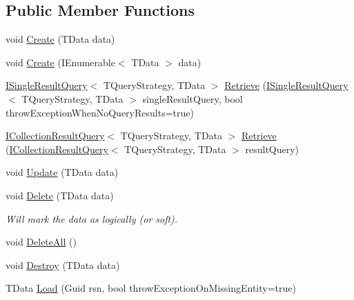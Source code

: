 \subsection*{Public Member Functions}
\begin{DoxyCompactItemize}
\item 
void \hyperlink{interfaceCqrs_1_1Repositories_1_1IRepository_a240c8d094207a22b0c805a5c830d8615_a240c8d094207a22b0c805a5c830d8615}{Create} (T\+Data data)
\item 
void \hyperlink{interfaceCqrs_1_1Repositories_1_1IRepository_ae3481fb2ecb0146308e07a9dd6af8c14_ae3481fb2ecb0146308e07a9dd6af8c14}{Create} (I\+Enumerable$<$ T\+Data $>$ data)
\item 
\hyperlink{interfaceCqrs_1_1Repositories_1_1Queries_1_1ISingleResultQuery}{I\+Single\+Result\+Query}$<$ T\+Query\+Strategy, T\+Data $>$ \hyperlink{interfaceCqrs_1_1Repositories_1_1IRepository_a65848508067b81e82da72af2063f2c07_a65848508067b81e82da72af2063f2c07}{Retrieve} (\hyperlink{interfaceCqrs_1_1Repositories_1_1Queries_1_1ISingleResultQuery}{I\+Single\+Result\+Query}$<$ T\+Query\+Strategy, T\+Data $>$ single\+Result\+Query, bool throw\+Exception\+When\+No\+Query\+Results=true)
\item 
\hyperlink{interfaceCqrs_1_1Repositories_1_1Queries_1_1ICollectionResultQuery}{I\+Collection\+Result\+Query}$<$ T\+Query\+Strategy, T\+Data $>$ \hyperlink{interfaceCqrs_1_1Repositories_1_1IRepository_a0faeb50aa395d63ccd81e66906360e81_a0faeb50aa395d63ccd81e66906360e81}{Retrieve} (\hyperlink{interfaceCqrs_1_1Repositories_1_1Queries_1_1ICollectionResultQuery}{I\+Collection\+Result\+Query}$<$ T\+Query\+Strategy, T\+Data $>$ result\+Query)
\item 
void \hyperlink{interfaceCqrs_1_1Repositories_1_1IRepository_af8a0b1cf5eedd7653d2867ab38657d46_af8a0b1cf5eedd7653d2867ab38657d46}{Update} (T\+Data data)
\item 
void \hyperlink{interfaceCqrs_1_1Repositories_1_1IRepository_a71c60de3588a757da2d25350c98374fd_a71c60de3588a757da2d25350c98374fd}{Delete} (T\+Data data)
\begin{DoxyCompactList}\small\item\em Will mark the {\itshape data}  as logically (or soft). \end{DoxyCompactList}\item 
void \hyperlink{interfaceCqrs_1_1Repositories_1_1IRepository_a0da5f756a0fd184dc51a81741f82734a_a0da5f756a0fd184dc51a81741f82734a}{Delete\+All} ()
\item 
void \hyperlink{interfaceCqrs_1_1Repositories_1_1IRepository_a3a7a60be19498813b3822558b88fad66_a3a7a60be19498813b3822558b88fad66}{Destroy} (T\+Data data)
\item 
T\+Data \hyperlink{interfaceCqrs_1_1Repositories_1_1IRepository_ae545451c48d1e2b5693db73e169e100d_ae545451c48d1e2b5693db73e169e100d}{Load} (Guid rsn, bool throw\+Exception\+On\+Missing\+Entity=true)
\end{DoxyCompactItemize}


